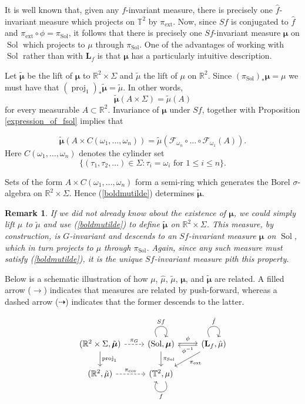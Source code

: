 \documentclass[11pt,letterpaper,reqno]{article}
\newtheorem{remark}{Remark}[section]
\newcommand{\TT}{\mathbb{T}^2}
\newcommand{\RR}{\mathbb{R}^2}
\newcommand{\hTTf}[1][f]{\mathbf{L}_{#1}}
\newcommand{\cF}{\mathcal{F}}
\newcommand{\tmu}{\tilde{\mu}}
\newcommand{\hf}{\hat{f}}
\newcommand{\bmu}{\boldsymbol{\mu}}
\newcommand{\hmu}{\hat{\mu}}
\newcommand{\pcov}{\pi_{\mathrm{cov}}}
\newcommand{\pext}{\pi_{\mathrm{ext}}}
\newcommand{\Sol}{\operatorname{Sol}}
\newcommand{\proj}{\operatorname{proj}}
\newcommand{\fsol}{Sf}
\begin{document}
It is well known that, given any $f$-invariant measure, there is precisely one $\hf$-invariant measure which projects on $\TT$ by $\pext$. Now, since $\fsol$ is conjugated to $\hf$ and $\pext \circ \phi = \pi_{\Sol}$, it follows that there is precisely one $\fsol$-invariant measure $\bmu$ on $\Sol$ which projects to $\mu$ through $\pi_{\Sol}$. One of the advantages of working with $\Sol$ rather than with $\hTTf$ is that $\bmu$ has a particularly intuitive description. 

Let $\tilde{\bmu}$ be the lift of $\bmu$ to $\RR \times \Sigma$ and $\tmu$ the lift of $\mu$ on $\RR$. Since $(\pi_{\Sol})_*\bmu = \mu$ we must have that $(\proj_1)_* \tilde{\bmu} = \tmu$. In other words, 
\[\tilde{\bmu}(A \times \Sigma)  = \tmu(A)\]
for every measurable $A \subset \RR$.  Invariance of $\bmu$ under $\fsol$, together with Proposition \ref{expression_of_fsol} implies that

\begin{equation} \label{boldmutilde} 
\tilde{\bmu}(A \times C(\omega_1, \ldots, \omega_n)) = \tmu(\cF_{\omega_n} \circ \ldots \circ \cF_{\omega_1}(A)).
\end{equation}
Here $C(\omega_1, \ldots, \omega_n)$ denotes the cylinder set 
\[\{(\tau_1, \tau_2, \ldots) \in \Sigma: \tau_i = \omega_i \text{ for } 1 \leq i \leq n \}.\]

Sets of the form $A \times C(\omega_1, \ldots, \omega_n)$ form a semi-ring which generates the Borel $\sigma$-algebra on $\RR \times \Sigma$. Hence (\ref{boldmutilde}) determines $\tilde{\bmu}$. 

\begin{remark}
If we did not already know about the existence of $\bmu$, we could simply lift $\mu$ to $\tmu$ and use (\ref{boldmutilde}) to define $\tilde{\bmu}$ on $\RR \times \Sigma$. This measure, by construction, is $G$-invariant and descends to an $\fsol$-invariant measure $\bmu$ on $\Sol$, which in turn projects to $\mu$ through $\pi_{\Sol}$. Again, since any such measure must satisfy (\ref{boldmutilde}), it is the unique $\fsol$-invariant measure pith this property. 
\end{remark}

Below is a schematic illustration of how $\mu$, $\hmu$, $\tmu$, $\bmu$, and $\tilde{\bmu}$ are related. A filled arrow ($\rightarrow$) indicates that measures are related by push-forward, whereas a dashed arrow ($\dashrightarrow$) indicates that the former descends to the latter.

\begin{equation} \label{relation_measures}
\begin{tikzcd}
(\RR \times \Sigma, \tilde{\bmu}) 
\ar[r, dashed, "\pi_G"] \ar[d, "\proj_1"] 
& (\Sol, \bmu)  \ar[r, shift left=0.3ex, "\phi"] \ar[d, "\pi_{\Sol}"] \ar[loop, out=120, in=60, distance=20, "\fsol"]
& (\hTTf, \hmu)  \ar[l, shift left=0.3ex, "\phi^{-1}"] \ar[ld, "\pext"]  \ar[loop, out=120, in=60, distance=20, "\hf"] \\
(\RR, \tmu) \ar[r, dashed, "\pcov"] 
& (\TT, \mu) \ar[loop, out=300, in=240, distance=20, "f"]
\end{tikzcd}
\end{equation}
\end{document}
